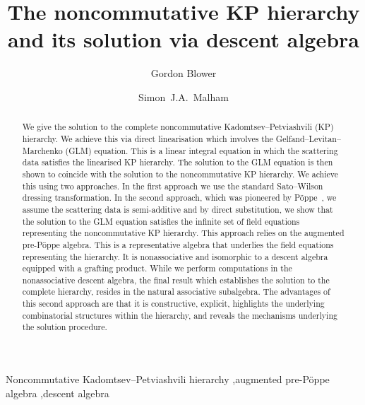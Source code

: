 \documentclass[5p,twocolumn]{elsarticle}
\begin{document}
\begin{frontmatter}
\title{The noncommutative KP hierarchy and its solution via descent algebra}
\author[1]{Gordon Blower}
\author[2]{Simon~J.A.~Malham}    
\address[1]{Department of Mathematics and Statistics, Lancaster University, Lancaster LA1~4YF, UK}
\address[2]{Maxwell Institute for Mathematical Sciences, and School of Mathematical and Computer Sciences,   
  Heriot-Watt University, Edinburgh EH14~4AS, UK} %

\begin{abstract}
  We give the solution to the complete noncommutative Kadomtsev--Petviashvili (KP) hierarchy.
  We achieve this via direct linearisation which involves the Gelfand--Levitan--Marchenko (GLM) equation.
  This is a linear integral equation in which the scattering data satisfies the linearised KP hierarchy. 
  The solution to the GLM equation is then shown to coincide with the solution to the noncommutative KP hierarchy.
  We achieve this using two approaches. In the first approach we use the standard Sato--Wilson dressing transformation.  
  In the second approach, which was pioneered by P\"oppe~\cite{PKP}, we assume the scattering data is semi-additive and by direct substitution,
  we show that the solution to the GLM equation satisfies the infinite set of field equations representing the noncommutative KP hierarchy.
  This approach relies on the augmented pre-P\"oppe algebra.
  This is a representative algebra that underlies the field equations representing the hierarchy.
  It is nonassociative and isomorphic to a descent algebra equipped with a grafting product.
  While we perform computations in the nonassociative descent algebra, the final result which establishes the solution to the complete hierarchy, resides in the natural associative subalgebra.
  The advantages of this second approach are that it is constructive, explicit, highlights the underlying combinatorial structures within the hierarchy,
  and reveals the mechanisms underlying the solution procedure. 
\end{abstract}
\begin{keyword} Noncommutative Kadomtsev--Petviashvili hierarchy \sep augmented pre-P\"oppe algebra \sep descent algebra \end{keyword} 
\end{frontmatter}
\end{document}
